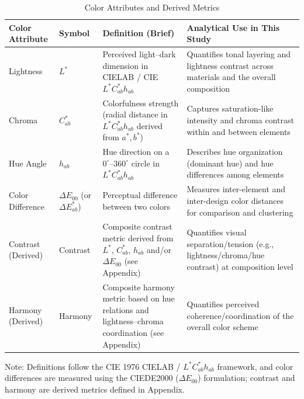 \begin{table}[htbp]
\centering
\caption{Color Attributes and Derived Metrics}
\label{tab:color_metrics}
\renewcommand{\arraystretch}{1.2}
\begin{threeparttable}
\begin{tabularx}{0.98\textwidth}{
  >{\raggedright\arraybackslash}p{}
  >{\centering\arraybackslash}p{}
  >{\raggedright\arraybackslash}X
  >{\raggedright\arraybackslash}X
}
\toprule
\textbf{Color Attribute} & \textbf{Symbol} & \textbf{Definition (Brief)} & \textbf{Analytical Use in This Study} \\
\midrule
Lightness & $L^*$ & Perceived light--dark dimension in CIELAB / CIE $L^*C^*_{ab}h_{ab}$ & Quantifies tonal layering and lightness contrast across materials and the overall composition \\
Chroma & $C^*_{ab}$ & Colorfulness strength (radial distance in $L^*C^*_{ab}h_{ab}$ derived from $a^*, b^*$) & Captures saturation-like intensity and chroma contrast within and between elements \\
Hue Angle & $h_{ab}$ & Hue direction on a $0^\circ$--$360^\circ$ circle in $L^*C^*_{ab}h_{ab}$ & Describes hue organization (dominant hue) and hue differences among elements \\
Color Difference & $\Delta E_{00}$ (or $\Delta E^*_{ab}$) & Perceptual difference between two colors & Measures inter-element and inter-design color distances for comparison and clustering \\
Contrast (Derived) & Contrast & Composite contrast metric derived from $L^*$, $C^*_{ab}$, $h_{ab}$ and/or $\Delta E_{00}$ (see Appendix) & Quantifies visual separation/tension (e.g., lightness/chroma/hue contrast) at composition level \\
Harmony (Derived) & Harmony & Composite harmony metric based on hue relations and lightness--chroma coordination (see Appendix) & Quantifies perceived coherence/coordination of the overall color scheme \\
\bottomrule
\end{tabularx}
\begin{tablenotes}[flushleft]
\footnotesize
\item Note: Definitions follow the CIE 1976 CIELAB / $L^*C^*_{ab}h_{ab}$ framework, and color differences are measured using the CIEDE2000 ($\Delta E_{00}$) formulation; contrast and harmony are derived metrics defined in Appendix.
\end{tablenotes}
\end{threeparttable}
\end{table}



